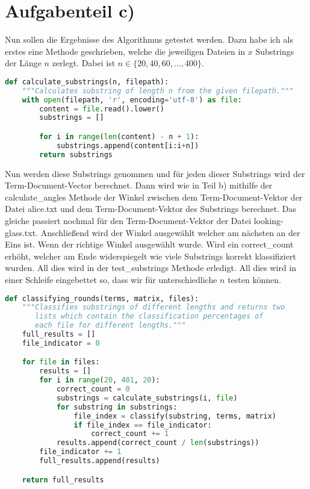 \documentclass{article}
\begin{document}
\section*{Aufgabenteil c)}
Nun sollen die Ergebnisse des Algorithmus getestet werden. Dazu habe ich als erstes eine Methode geschrieben, welche die jeweiligen Dateien in $x$ Substrings der Länge $n$ zerlegt. Dabei ist $n\in\{20,40,60,\dots,400\}$.
\begin{center}
\begin{minipage}{0.8\linewidth}
\begin{lstlisting}[language=Python]
def calculate_substrings(n, filepath):
    """Calculates substring of length n from the given filepath."""
    with open(filepath, 'r', encoding='utf-8') as file:
        content = file.read().lower()
        substrings = []

        for i in range(len(content) - n + 1):
            substrings.append(content[i:i+n])
        return substrings
\end{lstlisting}
\end{minipage}
\end{center}
Nun werden diese Substrings genommen und für jeden dieser Substrings wird der Term-Document-Vector berechnet. Dann wird wie in Teil b) mithilfe der calculate\_angles Methode der Winkel zwischen dem Term-Document-Vektor der Datei alice.txt und dem Term-Document-Vektor des Substrings berechnet. Das gleiche passiert nochmal für den Term-Document-Vektor der Datei looking-glass.txt. Anschließend wird der Winkel ausgewählt welcher am nächsten an der Eins ist. Wenn der richtige Winkel ausgewählt wurde. Wird ein correct\_count erhöht, welcher am Ende widerspiegelt wie viele Substrings korrekt klassifiziert wurden. All dies wird in der test\_substrings Methode erledigt. All dies wird in einer Schleife eingebettet so, dass wir für unterschiedliche $n$ testen können.
\begin{center}
\begin{minipage}{0.8\linewidth}
\begin{lstlisting}[language=Python]
def classifying_rounds(terms, matrix, files):
    """Classifies substrings of different lengths and returns two
       lists which contain the classification percentages of
       each file for different lengths."""
    full_results = []
    file_indicator = 0

    for file in files:
        results = []
        for i in range(20, 401, 20):
            correct_count = 0
            substrings = calculate_substrings(i, file)
            for substring in substrings:
                file_index = classify(substring, terms, matrix)
                if file_index == file_indicator:
                    correct_count += 1
            results.append(correct_count / len(substrings))
        file_indicator += 1
        full_results.append(results)

    return full_results
\end{lstlisting}
\end{minipage}
\end{center}
\end{document}
